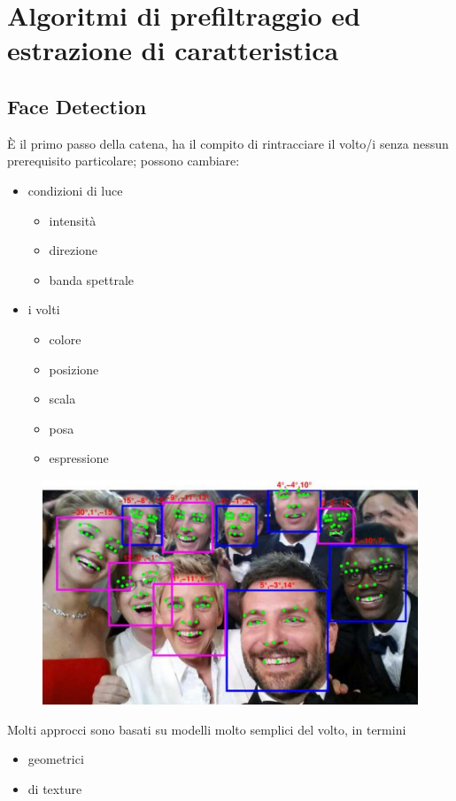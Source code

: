 \documentclass{report}
\begin{document}
\chapter{Algoritmi di prefiltraggio ed estrazione di caratteristica}

\section{Face Detection}
È il primo passo della catena, ha il compito di rintracciare 
il volto/i senza nessun prerequisito particolare; possono cambiare:
\begin{itemize}
    \item condizioni di luce
    \begin{itemize}
        \item intensità
        \item direzione 
        \item banda spettrale 
    \end{itemize}
    \item i volti 
    \begin{itemize}
        \item colore 
        \item posizione 
        \item scala 
        \item posa 
        \item espressione 
    \end{itemize}
\end{itemize}

\begin{figure}[ht]
    \centering
    \includegraphics[width=0.7\linewidth]{images/face-detection.png}
\end{figure}

\noindent Molti approcci sono basati su modelli molto semplici del volto, in termini 
\begin{itemize}
    \item geometrici
    \item di texture
\end{itemize}
\end{document}
